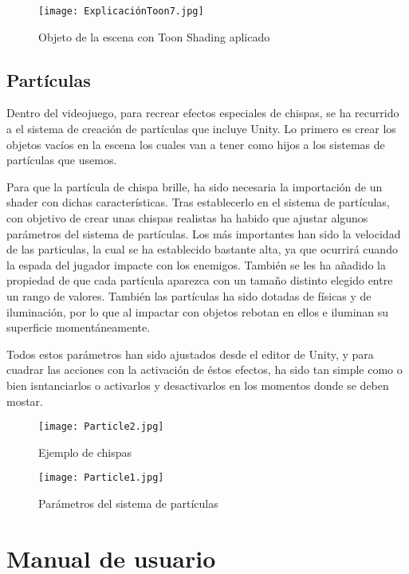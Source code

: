 \begin{figure}[H]
    \centering
    \texttt{[image: ExplicaciónToon7.jpg]}
    \caption{Objeto de la escena con Toon Shading aplicado}
\end{figure}

\subsection{Partículas}

Dentro del videojuego, para recrear efectos especiales de chispas, se ha recurrido a el sistema de creación de partículas que incluye Unity. Lo primero es crear los objetos vacíos en la escena los cuales van a tener como hijos a los sistemas de partículas que usemos.

Para que la partícula de chispa brille, ha sido necesaria la importación de un shader con dichas características. Tras establecerlo en el sistema de partículas, con objetivo de crear unas chispas realistas ha habido que ajustar algunos parámetros del sistema de partículas. Los más importantes han sido la velocidad de las particulas, la cual se ha establecido bastante alta, ya que ocurrirá cuando la espada del jugador impacte con los enemigos. También se les ha añadido la propiedad de que cada partícula aparezca con un tamaño distinto elegido entre un rango  de valores. También las partículas ha sido dotadas de físicas y de iluminación, por lo que al impactar con objetos rebotan en ellos e iluminan su superficie momentáneamente.

Todos estos parámetros han sido ajustados desde el editor de Unity, y para cuadrar las acciones con la activación de éstos efectos, ha sido tan simple como o bien isntanciarlos o activarlos y desactivarlos en los momentos donde se deben mostar.

\begin{figure}[H]
    \centering
    \texttt{[image: Particle2.jpg]}
    \caption{Ejemplo de chispas}
\end{figure}


\begin{figure}[H]
    \centering
    \texttt{[image: Particle1.jpg]}
    \caption{Parámetros del sistema de partículas}
\end{figure}

\section{Manual de usuario}
\label{sec:manual}

